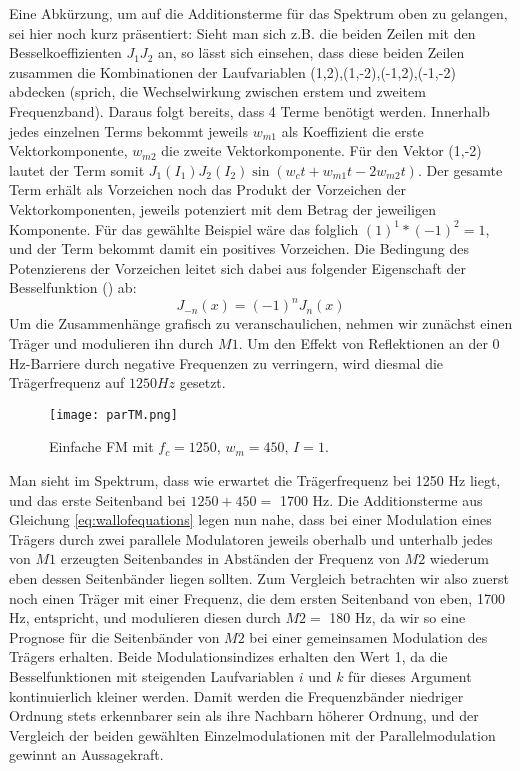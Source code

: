 Eine Abkürzung, um auf die Additionsterme für das Spektrum oben zu gelangen, sei hier noch kurz präsentiert: Sieht man sich z.B. die beiden Zeilen mit den Besselkoeffizienten \begin{math} J_1J_2 \end{math} an, so lässt sich einsehen, dass diese beiden Zeilen zusammen die Kombinationen der Laufvariablen (1,2),(1,-2),(-1,2),(-1,-2) abdecken (sprich, die Wechselwirkung zwischen erstem und zweitem Frequenzband). Daraus folgt bereits, dass 4 Terme benötigt werden. Innerhalb jedes einzelnen Terms bekommt jeweils \begin{math} w_{m1} \end{math} als Koeffizient die erste Vektorkomponente, \begin{math} w_{m2} \end{math} die zweite Vektorkomponente. Für den Vektor (1,-2) lautet der Term somit \begin{math} J_1(I_1)J_2(I_2)\sin(w_ct + w_{m1}t - 2w_{m2}t) \end{math}. Der gesamte Term erhält als Vorzeichen noch das Produkt der Vorzeichen der Vektorkomponenten, jeweils potenziert mit dem Betrag der jeweiligen Komponente. Für das gewählte Beispiel wäre das folglich \begin{math} (1)^1*(-1)^2 = 1 \end{math}, und der Term bekommt damit ein positives Vorzeichen. Die Bedingung des Potenzierens der Vorzeichen leitet sich dabei aus folgender Eigenschaft der Besselfunktion (\cite[S.358, Satz~9.1.5]{abramowitz}) ab:
\begin{equation}
J_{-n}(x) = (-1)^nJ_n(x)
\end{equation}
Um die Zusammenhänge grafisch zu veranschaulichen, nehmen wir zunächst einen Träger und modulieren ihn durch $M1$. Um den Effekt von Reflektionen an der 0 Hz-Barriere durch negative Frequenzen zu verringern, wird diesmal die Trägerfrequenz auf $1250 Hz$ gesetzt. 
\FloatBarrier
\begin{figure} [ht]
\centering
  \texttt{[image: parTM.png]}
\caption{Einfache FM mit $f_c = 1250$, $w_m = 450$, $I = 1$. }
\end{figure}
\FloatBarrier
Man sieht im Spektrum, dass wie erwartet die Trägerfrequenz bei 1250 Hz liegt, und das erste Seitenband bei $ 1250 + 450 =$ 1700 Hz. Die Additionsterme aus Gleichung \ref{eq:wallofequations} legen nun nahe, dass bei einer Modulation eines Trägers durch zwei parallele Modulatoren jeweils oberhalb und unterhalb jedes von $M1$ erzeugten Seitenbandes in Abständen der Frequenz von $M2$ wiederum eben dessen Seitenbänder liegen sollten. Zum Vergleich betrachten wir also zuerst noch einen Träger mit einer Frequenz, die dem ersten Seitenband von eben, 1700 Hz, entspricht, und modulieren diesen durch $M2 =$ 180 Hz, da wir so eine Prognose für die Seitenbänder von $M2$ bei einer gemeinsamen Modulation des Trägers erhalten. Beide Modulationsindizes erhalten den Wert 1, da die Besselfunktionen mit steigenden Laufvariablen $i$ und $k$ für dieses Argument kontinuierlich kleiner werden. Damit werden die Frequenzbänder niedriger Ordnung stets erkennbarer sein als ihre Nachbarn höherer Ordnung, und der Vergleich der beiden gewählten Einzelmodulationen mit der Parallelmodulation gewinnt an Aussagekraft.
